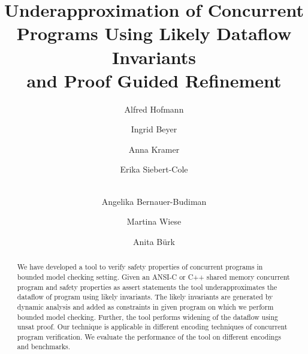 \documentclass[runningheads]{llncs}
\begin{document}
\pagestyle{headings}

\mainmatter

\title{Underapproximation of Concurrent Programs Using Likely Dataflow Invariants \\
and Proof Guided Refinement}


\author{Alfred Hofmann
\and Ingrid Beyer \and
Anna Kramer \and Erika Siebert-Cole \and\\
Angelika Bernauer-Budiman \and
Martina Wiese \and Anita B\"urk}



\maketitle

\begin{abstract}
We have developed a tool to verify safety properties of concurrent programs in bounded model checking setting. Given an ANSI-C or C++ shared memory concurrent program and safety properties as assert statements the tool underapproximates the dataflow of program using likely invariants. The likely invariants are generated by dynamic analysis and added as constraints in given program on which we perform bounded model checking. Further, the tool performs widening of the dataflow using unsat proof. Our technique is applicable in different encoding techniques of concurrent program verification. We evaluate the performance of the tool on different encodings and benchmarks.
\end{abstract}
\end{document}
